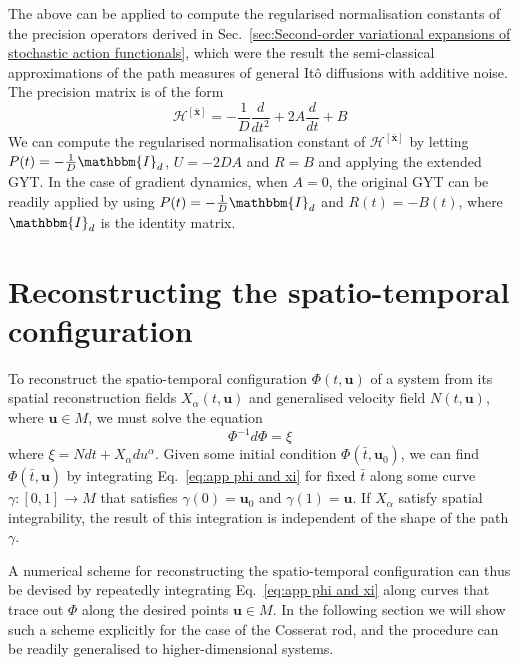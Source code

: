 \documentclass[withindex,glossary,techreport]{cam-thesis}
\begin{document}
\begin{appendices}
The above can be applied to compute the regularised normalisation constants of the precision operators derived in Sec.~\ref{sec:Second-order variational expansions of stochastic action functionals}, which were the result the semi-classical approximations of the path measures of general It\^{o} diffusions with additive noise. The precision matrix is of the form
\begin{equation}
	\mathcal{H}^{[\bar{\mathbf{x}}]} =-\frac{1}{D} \frac{d}{dt^{2}}+2A\frac{d}{dt}+B
\end{equation}
We can compute the regularised normalisation constant of $\mathcal{H}^{[\bar{\mathbf{x}}]}$ by letting $P(t)=-\frac{1}{D} \mathbbm{I}_{d}$, $U=-2 D A$ and $R=B$ and applying the extended GYT. In the case of gradient dynamics, when $A = 0$, the original GYT can be readily applied by using $P(t)=-\frac{1}{D} \mathbbm{I}_{d}$ and $R(t)=-B(t)$, where $\mathbbm{I}_{d}$ is the identity matrix.


\chapter{Reconstructing the spatio-temporal configuration} \label{app:Reconstructing the spatio-temporal configuration}

To reconstruct the spatio-temporal configuration $\Phi(t, \mathbf{u})$ of a system from its spatial reconstruction fields $X_\alpha(t, \mathbf{u})$ and generalised velocity field $N(t,\mathbf{u})$, where $\mathbf{u} \in M$, we must solve the equation
\begin{equation} \label{eq:app phi and xi}
	\Phi^{-1} d \Phi = \xi
\end{equation}
where $\xi = N dt + X_\alpha du^\alpha$. Given some initial condition $\Phi(\bar{t}, \mathbf{u}_0)$, we can find $\Phi(\bar{t},\mathbf{u})$ by integrating Eq.~\ref{eq:app phi and xi} for fixed $\bar{t}$ along some curve $\gamma : [0,1] \to M$ that satisfies $\gamma(0) = \mathbf{u}_0$ and $\gamma(1) = \mathbf{u}$. If $X_\alpha$ satisfy spatial integrability, the result of this integration is independent of the shape of the path $\gamma$.

A numerical scheme for reconstructing the spatio-temporal configuration can thus be devised by repeatedly integrating Eq.~\ref{eq:app phi and xi} along curves that trace out $\Phi$ along the desired points $\mathbf{u} \in M$. In the following section we will show such a scheme explicitly for the case of the Cosserat rod, and the procedure can be readily generalised to higher-dimensional systems.


\end{appendices}
\end{document}
